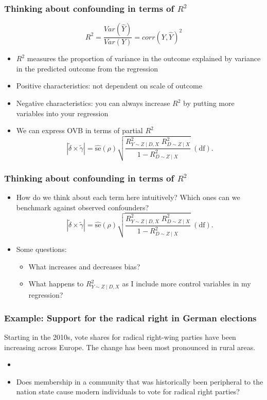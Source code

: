 \documentclass[11pt,xcolor={dvipsnames},usepdftitle=false]{beamer}
\begin{document}
\begin{frame}
\frametitle{Thinking about confounding in terms of $R^2$}
\[R^2 = \frac{Var(\hat{Y})}{Var(Y)} = corr(Y, \hat{Y} )^2\]

\begin{itemize}
\item $R^2$ measures the proportion of variance in the outcome explained by variance in the predicted outcome from the regression
\item Positive characteristics: not dependent on scale of outcome
\item Negative characteristics: you can always increase $R^2$ by putting more variables into your regression
\item We can express OVB in terms of partial $R^2$
\[|\tilde \delta \times  \tilde \gamma |
= \widehat{\text{se}}(\rho)
  \sqrt{
    \frac{
      R^2_{Y \sim Z \mid D, X} \;
      R^2_{D \sim Z \mid X}
    }{
      1 - R^2_{D \sim Z \mid X}
    }
  }
  \; (\text{df}).
\]
\end{itemize}
\end{frame}

\begin{frame}
\frametitle{Thinking about confounding in terms of $R^2$}
\begin{itemize}
\item How do we think about each term here intuitively? Which ones can we benchmark against observed confounders?
\[|\tilde \delta \times  \tilde \gamma |
= \widehat{\text{se}}(\rho)
  \sqrt{
    \frac{
      R^2_{Y \sim Z \mid D, X} \;
      R^2_{D \sim Z \mid X}
    }{
      1 - R^2_{D \sim Z \mid X}
    }
  }
  \; (\text{df}).
\]
\item Some questions:
\begin{itemize}
\item What increases and decreases bias?
\item What happens to $R^2_{Y \sim Z \mid D, X}$ as I include more control variables in my regression?
\end{itemize}
\end{itemize}
\end{frame}

\begin{frame}
\centering
{}
\end{frame}

\begin{frame}
\frametitle{Example: Support for the radical right in German elections}
Starting in the 2010s, vote shares for radical right-wing parties have been increasing across Europe. The change has been most pronounced in rural areas.
\begin{itemize}
    \item {}
    \item Does membership in a community that was historically been peripheral to the nation state cause modern individuals to vote for radical right parties?
\end{itemize}
\end{frame}
\end{document}
